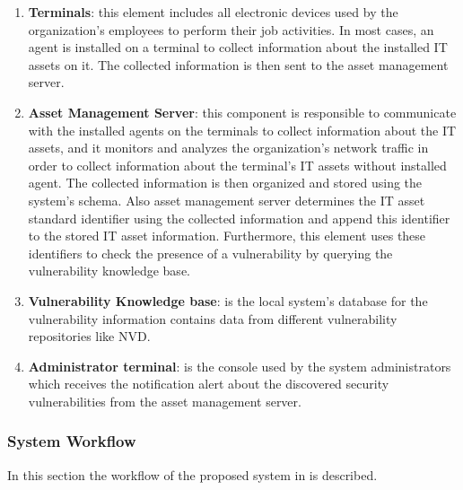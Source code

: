 \documentclass{llncs}
\begin{document}
 \begin{enumerate}
 \item \textbf{Terminals}: this element includes all electronic devices used by the organization's employees to perform their job activities. In most cases, an agent is installed on a terminal to collect information about the installed IT assets on it. The collected information is then sent to the asset management server.
 
 \item \textbf{Asset Management Server}: this component is responsible to communicate with the installed agents on the terminals to collect information about the IT assets, and it monitors and analyzes the organization's network traffic in order to collect information about the terminal's IT assets without installed agent. The collected information is then organized and stored using the system's schema. Also asset management server determines the IT asset standard identifier using the collected information and append this identifier to the stored IT asset information. Furthermore, this element uses these identifiers to check the presence of a vulnerability by querying the vulnerability knowledge base.
 
 \item \textbf{Vulnerability Knowledge base}: is the local system's database for the vulnerability information contains data from different vulnerability repositories like NVD.
 
 
  \item \textbf{Administrator terminal}: is the console used by the system administrators which receives the notification alert about the discovered security vulnerabilities from the asset management server.     
 \end{enumerate}
 

\subsubsection{System Workflow \newline}

\par In this section the workflow of the proposed system in \cite{paper1} is described.
 
\end{document}
